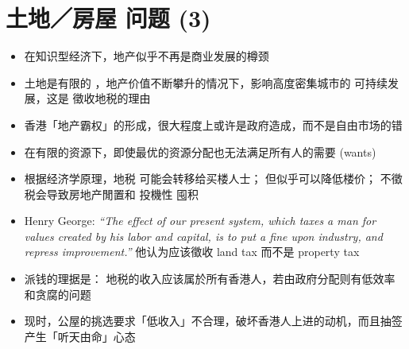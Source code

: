 \section{土地／房屋 问题 (3)}
\begin{itemize}
	\item 在知识型经济下，地产似乎不再是商业发展的樽颈
	
	\item 土地是有限的 ，地产价值不断攀升的情况下，影响高度密集城市的 可持续发展，这是 徵收地税的理由
	
	\item 香港「地产霸权」的形成，很大程度上或许是政府造成，而不是自由市场的错

	\nocite{Ryan-Collins2017}
	\nocite{Farvacque-Vitkoviac1992}
	\nocite{Blomley2004}
	\nocite{Linklater2013}
	\nocite{Adams2015}
	\nocite{简德三2012}
	\nocite{Poon2011}
	\nocite{潘慧娴2010}
	\nocite{OSullivan2012}
	\nocite{Rithmire2015}
	\nocite{Squires2013}
	\nocite{Harvey1996}
	\nocite{Girling1997}
	\nocite{Balia2009}
	\nocite{Peteri2003}
	\nocite{陈云2011}
	\nocite{周其仁2018}
	\nocite{Field2008}
	\nocite{Posner2018}

	\item 在有限的资源下，即使最优的资源分配也无法满足所有人的需要 (wants)

	\item 根据经济学原理，地税 可能会转移给买楼人士； 但似乎可以降低楼价； 不徵税会导致房地产閒置和 投機性 囤积
	
	\item Henry George: \textrm{\textit{``The effect of our present system, which taxes a man for values created by his labor and capital, is to put a fine upon industry, and repress improvement.''}} 他认为应该徵收 land tax 而不是 property tax

	\item 派钱的理据是： 地税的收入应该属於所有香港人，若由政府分配则有低效率和贪腐的问题
	
	\item 现时，公屋的挑选要求「低收入」不合理，破坏香港人上进的动机，而且抽签 产生「听天由命」心态




\end{itemize}


